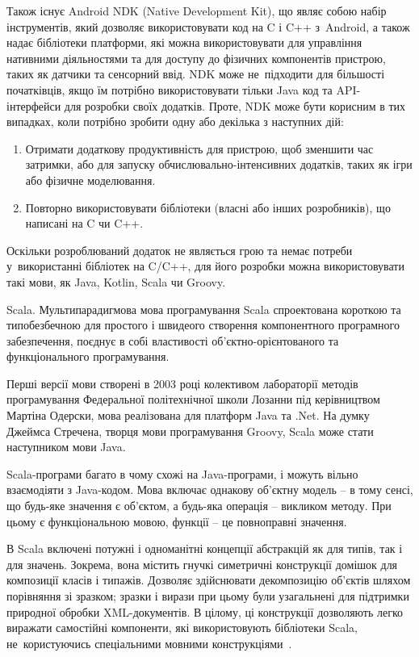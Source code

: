 \documentclass[../main.tex]{subfiles}
\begin{document}
Також існує Android NDK (Native Development Kit), що являє собою набір інструментів, який дозволяє використовувати код на C і C++ з~Android, а також надає бібліотеки платформи, які можна використовувати для управління нативними діяльностями та для доступу до фізичних компонентів пристрою, таких як датчики та сенсорний ввід. NDK може не~підходити для більшості початківців, якщо їм потрібно використовувати тільки Java код та API-інтерфейси для розробки своїх додатків. Проте, NDK може бути корисним в тих випадках, коли потрібно зробити одну або декілька з наступних дій:

\begin{enumerate}
	\item Отримати додаткову продуктивність для пристрою, щоб зменшити час затримки, або для запуску обчислювально-інтенсивних додатків, таких як ігри або фізичне моделювання.
	\item Повторно використовувати бібліотеки (власні або інших розробників), що написані на C чи C++.
\end{enumerate}

Оскільки розроблюваний додаток не являється грою та немає потреби у~використанні бібліотек на C/C++, для його розробки можна використовувати такі мови, як Java, Kotlin, Scala чи Groovy.

Scala.
Мультипарадигмова мова програмування Scala спроектована короткою та типобезбечною для простого і швидеого створення компонентного програмного забезпечення, поєднує в собі властивості об'єктно-орієнтованого та функціонального програмування. 

Перші версії мови створені в 2003 році колективом лабораторії методів програмування Федеральної політехнічної школи Лозанни під керівництвом Мартіна Одерски, мова реалізована для платформ Java та .Net. На думку Джеймса Стречена, творця мови програмування Groovy, Scala може стати наступником мови Java.

Scala-програми багато в чому схожі на Java-програми, і можуть вільно взаємодіяти з Java-кодом. Мова включає однакову об'єктну модель -- в тому сенсі, що будь-яке значення є об'єктом, а будь-яка операція -- викликом методу. При цьому є функціональною мовою, функції -- це повноправні значення.

В Scala включені потужні і одноманітні концепції абстракцій як для типів, так і для значень. Зокрема, вона містить гнучкі симетричні конструкції домішок для композиції класів і типажів. Дозволяє здійснювати декомпозицію об'єктів шляхом порівняння зі зразком; зразки і вирази при цьому були узагальнені для підтримки природної обробки \mbox{XML-документів}. В цілому, ці конструкції дозволяють легко виражати самостійні компоненти, які використовують бібліотеки Scala, не~користуючись спеціальними мовними конструкціями~\cite{scala}.
\end{document}

